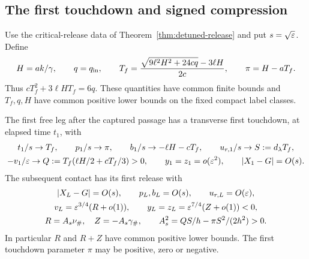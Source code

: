 \subsection{The first touchdown and signed compression}

Use the critical-release data of Theorem~\ref{thm:detuned-release}
and put $s=\sqrt{\varepsilon}$. Define
\begin{equation}
 H=ak/\gamma,\qquad q=q_{\rm in},\qquad
 T_f=\frac{\sqrt{9\ell^2H^2+24cq}-3\ell H}{2c},\qquad
 \pi=H-aT_f.
 \label{prep:first-flight-data}
\end{equation}
Thus $cT_f^2+3\ell HT_f=6q$. These quantities have common finite
bounds and $T_f,q,H$ have common positive lower bounds on the
fixed compact label classes.

\begin{proposition}
\label{prep:first-flight}
The first free leg after the captured passage has a transverse first
touchdown, at elapsed time $t_1$, with
\begin{gather}
 t_1/s\to T_f,\qquad p_1/s\to\pi,\qquad
 b_1/s\to-\ell H-cT_f,\qquad u_{r,1}/s\to S:=d_\lambda T_f,\\
 -v_1/\varepsilon\to Q:=T_f(\ell H/2+cT_f/3)>0,\qquad
 y_1=z_1=o(\varepsilon^2),\qquad |X_1-G|=O(s).
 \label{prep:first-touchdown}
\end{gather}
The subsequent contact has its first release with
\begin{gather}
 |X_L-G|=O(s),\qquad p_L,b_L=O(s),\qquad u_{r,L}=O(\varepsilon),\\
 v_L=\varepsilon^{3/4}(R+o(1)),\qquad
 y_L=z_L=\varepsilon^{7/4}(Z+o(1))<0,
 \label{prep:amplified-release}\\
 R=A_s\nu_\#,\quad Z=-A_s\gamma_\#,\qquad
 A_s^2=QS/h-\pi S^2/(2h^2)>0.
 \label{prep:amplitude}
\end{gather}
In particular $R$ and $R+Z$ have common positive lower bounds.
The first touchdown parameter $\pi$ may be positive, zero or negative.
\end{proposition}
